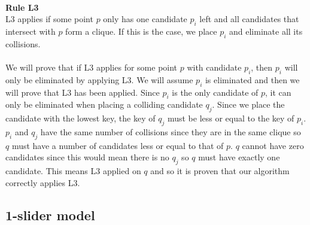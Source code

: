 \documentclass[crop=false,a4paper,oneside,11pt]{article}
\begin{document}
\\
\textbf{Rule L3}\\
L3 applies if some point $p$ only has one candidate $p_i$ left and all candidates that intersect with $p$ form a clique. If this is the case, we place $p_i$ and eliminate all its collisions.\\
\\
We will prove that if L3 applies for some point $p$ with candidate $p_i$, then $p_i$ will only be eliminated by applying L3. We will assume $p_i$ is eliminated and then we will prove that L3 has been applied. Since $p_i$ is the only candidate of $p$, it can only be eliminated when placing a colliding candidate $q_j$. Since we place the candidate with the lowest key, the key of $q_j$ must be less or equal to the key of $p_i$. $p_i$ and $q_j$ have the same number of collisions since they are in the same clique so $q$ must have a number of candidates less or equal to that of $p$. $q$ cannot have zero candidates since this would mean there is no $q_j$ so $q$ must have exactly one candidate. This means L3 applied on $q$ and so it is proven that our algorithm correctly applies L3.

\subsection{1-slider model}
\end{document}
